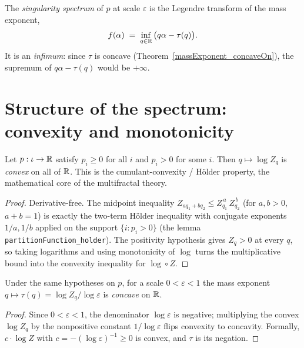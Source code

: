 \begin{definition}\label{singularitySpectrum}
  \leanok
  The \emph{singularity spectrum} of \(p\) at scale \(\varepsilon\) is the Legendre transform of
  the mass exponent,
  \[
    f(\alpha) \;=\; \inf_{q \in \mathbb{R}}\, \bigl(q\alpha - \tau(q)\bigr).
  \]
  It is an \emph{infimum}: since \(\tau\) is concave (Theorem~\ref{massExponent_concaveOn}), the
  supremum of \(q\alpha - \tau(q)\) would be \(+\infty\).
\end{definition}

\section{Structure of the spectrum: convexity and monotonicity}

\begin{theorem}\label{logPartitionFunction_convexOn}
  \leanok
  Let \(p : \iota \to \mathbb{R}\) satisfy \(p_i \ge 0\) for all \(i\) and \(p_i > 0\) for some \(i\).
  Then \(q \mapsto \log Z_q\) is \emph{convex} on all of \(\mathbb{R}\). This is the cumulant-convexity /
  H\"older property, the mathematical core of the multifractal theory.
\end{theorem}
\begin{proof}\leanok
  Derivative-free. The midpoint inequality
  \(Z_{aq_1 + bq_2} \le Z_{q_1}^{\,a}\, Z_{q_2}^{\,b}\) (for \(a, b > 0\), \(a + b = 1\)) is
  exactly the two-term H\"older inequality with conjugate exponents \(1/a, 1/b\) applied on the
  support \(\{i : p_i > 0\}\) (the lemma
  \texttt{partitionFunction\_holder}). The positivity hypothesis gives \(Z_q > 0\) at every \(q\),
  so taking logarithms and using monotonicity of \(\log\) turns the multiplicative bound into the
  convexity inequality for \(\log \circ Z\).
\end{proof}

\begin{theorem}\label{massExponent_concaveOn}
  \leanok
  Under the same hypotheses on \(p\), for a scale \(0 < \varepsilon < 1\) the mass exponent
  \(q \mapsto \tau(q) = \log Z_q / \log \varepsilon\) is \emph{concave} on \(\mathbb{R}\).
\end{theorem}
\begin{proof}\leanok
  Since \(0 < \varepsilon < 1\), the denominator \(\log\varepsilon\) is negative; multiplying the
  convex \(\log Z_q\) by the nonpositive constant \(1/\log\varepsilon\) flips convexity to
  concavity. Formally, \(c \cdot \log Z\) with \(c = -(\log\varepsilon)^{-1} \ge 0\) is convex,
  and \(\tau\) is its negation.
\end{proof}


